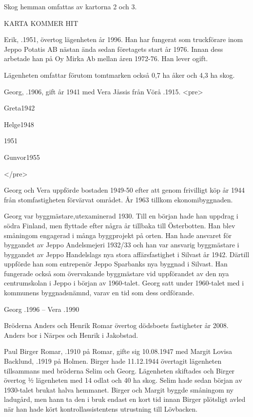 Skog hemman omfattas av kartorna 2 och 3.


KARTA KOMMER HIT




Erik, .1951, övertog lägenheten år 1996. Han har fungerat som truckförare inom Jeppo Potatis AB nästan ända sedan företagets start år 1976. Innan dess arbetade han på Oy Mirka Ab mellan åren 1972-76. Han lever ogift.

Lägenheten omfattar förutom tomtmarken också 0,7 ha åker och 4,3 ha skog.


Georg, .1906, gift år 1941 med Vera Jåssis från Vörå .1915.
<pre>
\begin{jhchildren}
  \item{Greta}{1942}{}
  \item{Helge}{1948}{}
  \item{}{1951}{}
  \item{Gunvor}{1955}{}
\end{jhchildren}
</pre>

Georg och Vera uppförde bostaden 1949-50 efter att genom frivilligt köp år 1944 från stomfastigheten förvärvat området. År 1963
tillkom  ekonomibyggnaden.

Georg var byggmästare,utexaminerad 1930. Till en början hade han uppdrag i södra Finland, men flyttade efter några år tillbaka till Österbotten. Han blev småningom engagerad i många byggprojekt på orten. Han hade ansvaret för byggandet av Jeppo Andelsmejeri 1932/33 och  han var ansvarig byggmästare i byggandet av Jeppo Handelslags nya stora affärsfastighet i Silvast år 1942. Därtill uppförde han som entrepenör Jeppo Sparbanks nya byggnad i Silvast. Han fungerade också som övervakande byggmästare vid uppförandet av den nya centrumskolan i Jeppo i början av 1960-talet. Georg satt under 1960-talet med i kommunens byggnadsnämnd, varav en tid som dess ordförande.

Georg .1996  --  Vera .1990



Bröderna Anders och Henrik Romar övertog dödsboets fastigheter år 2008. Anders bor i Närpes och Henrik i Jakobstad.


Paul Birger Romar, .1910 på Romar, gifte sig 10.08.1947 med Margit Lovisa Backlund, .1919 på Holmen. Birger hade 11.12.1944 övertagit lägenheten tillsammans med bröderna Selim och Georg. Lägenheten skiftades och Birger övertog ½ lägenheten med 14 odlat och 40 ha skog. Selim hade sedan början av 1930-talet brukat halva hemmanet. Birger och Margit byggde småningom ny ladugård, men hann ta den i bruk endast en kort tid innan Birger plötsligt avled när han hade kört kontrollassistentens utrustning till Lövbacken.

